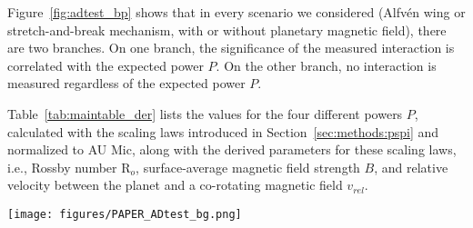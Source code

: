 \documentclass[twocolumn]{aastex631}
\begin{document}
Figure~\ref{fig:adtest_bp} shows that in every scenario we considered (Alfv\'en wing or stretch-and-break mechanism, with or without planetary magnetic field), there are two branches. On one branch, the significance of the measured interaction is correlated with the expected power $P$. On the other branch, no interaction is measured regardless of the expected power $P$. 

Table~\ref{tab:maintable_der} lists the values for the four different powers $P$, calculated with the scaling laws introduced in Section~\ref{sec:methods:pspi} and normalized to AU Mic, along with the derived parameters for these scaling laws, i.e., Rossby number R$_o$, surface-average magnetic field strength $B$, and relative velocity between the planet and a co-rotating magnetic field $v_{rel}$. 


\begin{table*}
\movetableright=-20mm
\footnotesize
    \caption{Flaring single star-planet system parameters.}
    
        \label{tab:maintable_lit}
    \tablerefs{}
\end{table*}


\begin{table*}
\footnotesize
\movetableright=-20mm
\caption{Flaring star-planet interaction. $Ro$, $B$, and $v_{rel}$, are derived from literature values (Table~\ref{tab:maintable_lit}). $P_{xx}$ stands for the power of stretch-and-break ($sb$) and ALfv\'en wing ($aw$) interaction mechanisms, assuming the planet has a magnetic field strength of 1 G. $P_{xx0}$ is the same, but assuming an unmagnetized planet. All powers are normalized to AU Mic. The $p$-value of the Anderson-Darling test is lower when the system shows more flares periodic with the planetary orbit.}

    \label{tab:maintable_der}

\end{table*}


\begin{figure*}[ht!]
    \begin{centering}
        \texttt{[image: figures/PAPER\_ADtest\_bg.png]}
        \caption{
            Expected power of SPI vs. AD test results, assuming four different scenarios, color-coded by stellar surface field strength.
        }
        \label{fig:adtest_bp}
    \end{centering}
\end{figure*}
\end{document}
